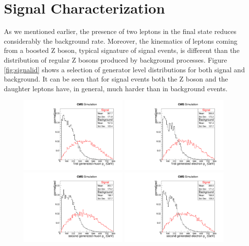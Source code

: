 \section{Signal Characterization}
As we mentioned earlier, the presence of two leptons in the final state reduces considerably the background rate. Moreover, the kinematics of leptons coming from a boosted Z boson, typical signature of signal events, is different than the distribution of regular Z bosons produced by background processes. Figure \ref{fig:signalid} shows a selection of generator level distributions for both signal and background. It can be seen that for signal events both the Z boson and the daughter leptons have, in general, much harder \ptrans than in background events.

\begin{figure}[p]
\centering
\includegraphics[width=0.48\textwidth]{figures/objects/genlep1ptMNP.pdf}
\includegraphics[width=0.48\textwidth]{figures/objects/genlep1ptENP.pdf}\\
\includegraphics[width=0.48\textwidth]{figures/objects/genlep2ptMNP.pdf}
\includegraphics[width=0.48\textwidth]{figures/objects/genlep2ptENP.pdf}\\

\end{figure}
